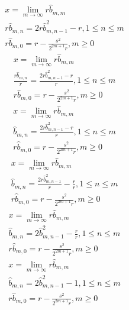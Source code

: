 \documentclass[a4paper,12pt]{report}
\begin{document}
\begin{subequations}
\begin{gather}
x = \lim \limits_{m \to \infty} r \hat{b}_{m,m} \\
r \hat{b}_{m,n} = 2r \hat{b}_{m,n-1}^2 - r, 1 \leq n \leq m \\
r \hat{b}_{m,0} = r - \frac{s^2}{2^{2m+1}r}, m \geq 0
\end{gather}
\end{subequations}
\begin{subequations}
\begin{gather}
x = \lim \limits_{m \to \infty} r \hat{b}_{m,m} \\
\frac{r \hat{b}_{m,n}}{r} = \frac{2r \hat{b}_{m,n-1}^2 - r}{r}, 1 \leq n \leq m \\
r \hat{b}_{m,0} = r - \frac{s^2}{2^{2m+1}r}, m \geq 0
\end{gather}
\end{subequations}
\begin{subequations}
\begin{gather}
x = \lim \limits_{m \to \infty} r \hat{b}_{m,m} \\
\hat{b}_{m,n} = \frac{2r \hat{b}_{m,n-1}^2 - r}{r}, 1 \leq n \leq m \\
r \hat{b}_{m,0} = r - \frac{s^2}{2^{2m+1}r}, m \geq 0
\end{gather}
\end{subequations}
\begin{subequations}
\begin{gather}
x = \lim \limits_{m \to \infty} r \hat{b}_{m,m} \\
\hat{b}_{m,n} = \frac{2r \hat{b}_{m,n-1}^2}{r} - \frac{r}{r}, 1 \leq n \leq m \\
r \hat{b}_{m,0} = r - \frac{s^2}{2^{2m+1}r}, m \geq 0
\end{gather}
\end{subequations}
\begin{subequations}
\begin{gather}
x = \lim \limits_{m \to \infty} r \hat{b}_{m,m} \\
\hat{b}_{m,n} = 2 \hat{b}_{m,n-1}^2 - \frac{r}{r}, 1 \leq n \leq m \\
r \hat{b}_{m,0} = r - \frac{s^2}{2^{2m+1}r}, m \geq 0
\end{gather}
\end{subequations}
\begin{subequations}
\begin{gather}
x = \lim \limits_{m \to \infty} r \hat{b}_{m,m} \\
\hat{b}_{m,n} = 2 \hat{b}_{m,n-1}^2 - 1, 1 \leq n \leq m \\
r \hat{b}_{m,0} = r - \frac{s^2}{2^{2m+1}r}, m \geq 0
\end{gather}
\end{subequations}
\end{document}
